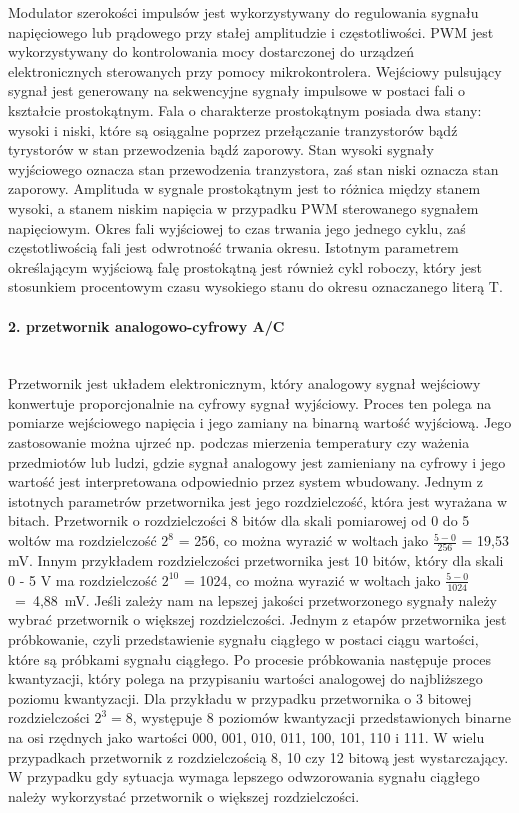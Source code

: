 \documentclass[12p]{article}
\begin{document}
Modulator szerokości impulsów jest wykorzystywany do regulowania sygnału napięciowego lub prądowego przy stałej amplitudzie i częstotliwości. PWM jest wykorzystywany do kontrolowania mocy dostarczonej do urządzeń elektronicznych sterowanych przy pomocy mikrokontrolera. Wejściowy pulsujący sygnał jest generowany na sekwencyjne sygnały impulsowe w postaci fali o kształcie prostokątnym. Fala o charakterze prostokątnym posiada dwa stany: wysoki i niski, które są osiągalne poprzez przełączanie tranzystorów bądź tyrystorów w stan przewodzenia bądź zaporowy. Stan wysoki sygnały wyjściowego oznacza stan przewodzenia tranzystora, zaś stan niski oznacza stan zaporowy. Amplituda w sygnale prostokątnym jest to różnica między stanem wysoki, a stanem niskim napięcia w przypadku PWM sterowanego sygnałem napięciowym. Okres fali wyjściowej to czas trwania jego jednego cyklu, zaś częstotliwością fali jest odwrotność trwania okresu. Istotnym parametrem określającym wyjściową falę prostokątną jest również cykl roboczy, który jest stosunkiem procentowym czasu wysokiego stanu do okresu oznaczanego literą T.

\paragraph{2. przetwornik analogowo-cyfrowy A/C} \mbox{} \\

Przetwornik jest układem elektronicznym, który analogowy sygnał wejściowy konwertuje proporcjonalnie na cyfrowy sygnał wyjściowy. Proces ten polega na pomiarze wejściowego napięcia i jego zamiany na binarną wartość wyjściową. Jego zastosowanie można ujrzeć np. podczas mierzenia temperatury czy ważenia przedmiotów lub ludzi, gdzie sygnał analogowy jest zamieniany na cyfrowy i jego wartość jest interpretowana odpowiednio przez system wbudowany. 
Jednym z istotnych parametrów przetwornika jest jego rozdzielczość, która jest wyrażana w bitach. Przetwornik o rozdzielczości 8 bitów dla skali pomiarowej od 0 do 5 woltów ma rozdzielczość $2^{8}$ = 256, co można wyrazić w woltach jako $\frac{5-0}{256}$ = 19,53 mV. Innym przykładem rozdzielczości przetwornika jest 10 bitów, który dla skali 0 - 5 V ma rozdzielczość $2^{10}$ = 1024, co można wyrazić w woltach jako \mbox{$\frac{5-0}{1024}$ = 4,88 mV}. Jeśli zależy nam na lepszej jakości przetworzonego sygnały należy wybrać przetwornik o większej rozdzielczości. Jednym z etapów przetwornika jest próbkowanie, czyli przedstawienie sygnału ciągłego w postaci ciągu wartości, które są próbkami sygnału ciągłego. Po procesie próbkowania następuje proces kwantyzacji, który polega na przypisaniu wartości analogowej do najbliższego poziomu kwantyzacji. Dla przykładu w przypadku przetwornika o 3 bitowej rozdzielczości $2^{3} = 8$, występuje 8 poziomów kwantyzacji przedstawionych binarne na osi rzędnych jako wartości 000, 001, 010, 011, 100, 101, 110 i 111. W wielu przypadkach przetwornik z rozdzielczością 8, 10 czy 12 bitową jest wystarczający. W przypadku gdy sytuacja wymaga lepszego odwzorowania sygnału ciągłego należy wykorzystać przetwornik o większej rozdzielczości.
\end{document}
